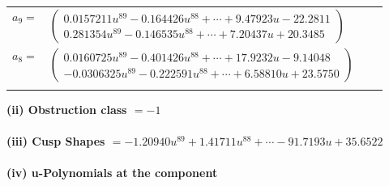 \documentclass[1p]{elsarticle_modified}
\theoremstyle{definition}
\begin{document}
\begin{tabular}{m{7pt} m{180pt} m{7pt} m{180pt} }
\flushright $a_{9}=$&$\begin{pmatrix}0.0157211 u^{89}-0.164426 u^{88}+\cdots+9.47923 u-22.2811\\0.281354 u^{89}-0.146535 u^{88}+\cdots+7.20437 u+20.3485\end{pmatrix}$ \\
\flushright $a_{8}=$&$\begin{pmatrix}0.0160725 u^{89}-0.401426 u^{88}+\cdots+17.9232 u-9.14048\\-0.0306325 u^{89}-0.222591 u^{88}+\cdots+6.58810 u+23.5750\end{pmatrix}$\\&\end{tabular}
\flushleft \textbf{(ii) Obstruction class $= -1$}\\~\\
\flushleft \textbf{(iii) Cusp Shapes $= -1.20940 u^{89}+1.41711 u^{88}+\cdots-91.7193 u+35.6522$}\\~\\
\newpage\renewcommand{\arraystretch}{1}
\flushleft \textbf{(iv) u-Polynomials at the component}\newline \\
\end{document}
